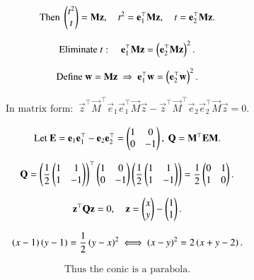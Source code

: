 \documentclass[journal,12pt,onecolumn]{IEEEtran}
\begin{document}
\begin{align}
	\text{Then } \begin{pmatrix}t^2\\ t\end{pmatrix}=\mathbf{M}\mathbf{z},\quad
	t^2=\mathbf{e}_1^\top \mathbf{M}\mathbf{z},\quad
	t=\mathbf{e}_2^\top \mathbf{M}\mathbf{z}.
\end{align}

\begin{align}
\text{Eliminate } t:\quad
	\mathbf{e}_1^\top \mathbf{M}\mathbf{z}
=
	\left(\mathbf{e}_2^\top \mathbf{M}\mathbf{z}\right)^{2}.
\end{align}

\begin{align}
	\text{Define } \mathbf{w}=\mathbf{M}\mathbf{z}\ \Rightarrow\
\mathbf{e}_1^\top\mathbf{w}=\left(\mathbf{e}_2^\top\mathbf{w}\right)^{2}.
\end{align}

\begin{align}
\text{In matrix form: }\
	\vec{z}^\top \vec{M}^\top \vec{e}_1\vec{e}_1^\top \vec{M} \vec{z}
-
	\vec{z}^\top \vec{M}^\top \vec{e}_2\vec{e}_2^\top \vec{M} \vec{z}
=0.
\end{align}

\begin{align}
	\text{Let } \mathbf{E}=\mathbf{e}_1\mathbf{e}_1^\top-\mathbf{e}_2\mathbf{e}_2^\top=\begin{pmatrix}1&0\\ 0&-1\end{pmatrix},\
	\mathbf{Q}=\mathbf{M}^\top \mathbf{E} \mathbf{M}.
\end{align}

\begin{align}
	\mathbf{Q}
=
	\left(\frac{1}{2}\begin{pmatrix}1&1\\ 1&-1\end{pmatrix}\right)^\top
\begin{pmatrix}1&0\\ 0&-1\end{pmatrix}
	\left(\frac{1}{2}\begin{pmatrix}1&1\\ 1&-1\end{pmatrix}\right)
=
\frac{1}{2}\begin{pmatrix}0&1\\ 1&0\end{pmatrix}.
\end{align}

\begin{align}
	\mathbf{z}^\top \mathbf{Q} \mathbf{z}=0,\quad
\mathbf{z}=\begin{pmatrix}x\\ y\end{pmatrix}-\begin{pmatrix}1\\ 1\end{pmatrix}.
\end{align}

\begin{align}
\left(x-1\right)\left(y-1\right)
=
\frac{1}{2}\left(y-x\right)^{2}
\ \Longleftrightarrow\
\left(x-y\right)^{2}=2\left(x+y-2\right).
\end{align}

\begin{align}
\text{Thus the conic is a parabola.}
\end{align}
\end{document}

